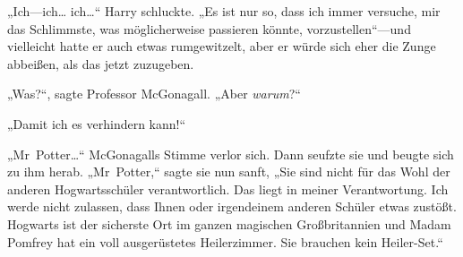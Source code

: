 
„Ich—ich… ich…“ Harry schluckte. „Es ist nur so, dass ich immer versuche, mir das Schlimmste, was möglicherweise passieren könnte, vorzustellen“—und vielleicht hatte er auch etwas rumgewitzelt, aber er würde sich eher die Zunge abbeißen, als das jetzt zuzugeben.

„Was?“, sagte Professor McGonagall. „Aber \emph{warum}?“

„Damit ich es verhindern kann!“

„Mr~Potter…“ McGonagalls Stimme verlor sich. Dann seufzte sie und beugte sich zu ihm herab. „Mr~Potter,“ sagte sie nun sanft, „Sie sind nicht für das Wohl der anderen Hogwartsschüler verantwortlich. Das liegt in meiner Verantwortung. Ich werde nicht zulassen, dass Ihnen oder irgendeinem anderen Schüler etwas zustößt. Hogwarts ist der sicherste Ort im ganzen magischen Großbritannien und Madam Pomfrey hat ein voll ausgerüstetes Heilerzimmer. Sie brauchen kein Heiler-Set.“

